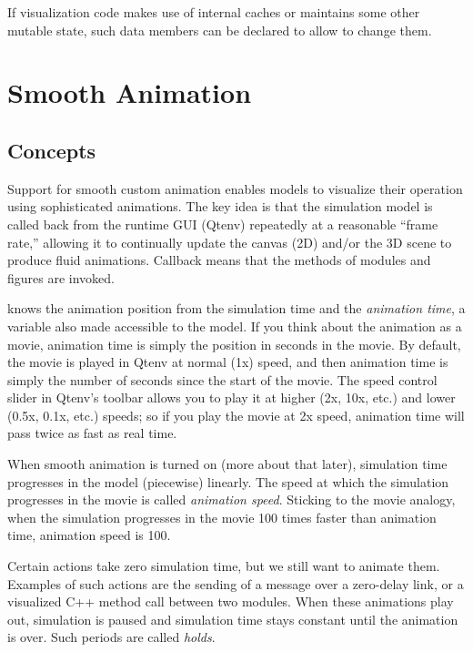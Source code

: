 If visualization code makes use of internal caches or maintains some other
mutable state, such data members can be declared  to allow
 to change them.


\section{Smooth Animation}
\label{sec:graphics:smooth-animation}

\subsection{Concepts}
\label{sec:graphics:animation-concepts}

Support for smooth custom animation enables models to visualize their operation
using sophisticated animations. The key idea is that the simulation model
is called back from the runtime GUI (Qtenv) repeatedly at a reasonable
``frame rate,'' allowing it to continually update the canvas (2D) and/or the
3D scene to produce fluid animations. Callback means that the
 methods of modules and figures are invoked.

 knows the animation position from the simulation time
and the \textit{animation time}, a variable also made accessible to the model.
If you think about the animation as a movie, animation time is simply the
position in seconds in the movie. By default, the movie is played in Qtenv at normal (1x)
speed, and then animation time is simply the number of seconds since the
start of the movie. The speed control slider in Qtenv's toolbar allows
you to play it at higher (2x, 10x, etc.) and lower (0.5x, 0.1x, etc.)
speeds; so if you play the movie at 2x speed, animation time will
pass twice as fast as real time.

When smooth animation is turned on (more about that later), simulation
time progresses in the model (piecewise) linearly. The speed at which the simulation
progresses in the movie is called \textit{animation speed}. Sticking to the
movie analogy, when the simulation progresses in the movie 100 times
faster than animation time, animation speed is 100.

Certain actions take zero simulation time, but we still want to animate
them. Examples of such actions are the sending of a message over a zero-delay link,
or a visualized C++ method call between two modules. When these animations play
out, simulation is paused and simulation time stays constant
until the animation is over. Such periods are called \textit{holds}.

